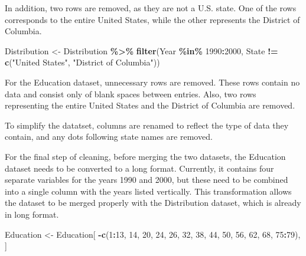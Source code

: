 \documentclass[
]{article}
\newenvironment{Shaded}{\begin{snugshade}}{\end{snugshade}}
\newcommand{\DecValTok}[1]{\textcolor[rgb]{0.00,0.00,0.81}{#1}}
\newcommand{\FunctionTok}[1]{\textcolor[rgb]{0.13,0.29,0.53}{\textbf{#1}}}
\newcommand{\NormalTok}[1]{#1}
\newcommand{\OtherTok}[1]{\textcolor[rgb]{0.56,0.35,0.01}{#1}}
\newcommand{\SpecialCharTok}[1]{\textcolor[rgb]{0.81,0.36,0.00}{\textbf{#1}}}
\newcommand{\StringTok}[1]{\textcolor[rgb]{0.31,0.60,0.02}{#1}}
\begin{document}
In addition, two rows are removed, as they are not a U.S. state. One of
the rows corresponds to the entire United States, while the other
represents the District of Columbia.

\begin{Shaded}
\begin{Highlighting}[]
\NormalTok{Distribution }\OtherTok{\textless{}{-}}\NormalTok{ Distribution }\SpecialCharTok{\%\textgreater{}\%}
  \FunctionTok{filter}\NormalTok{(Year }\SpecialCharTok{\%in\%} \DecValTok{1990}\SpecialCharTok{:}\DecValTok{2000}\NormalTok{, }
\NormalTok{         State }\SpecialCharTok{!=} \FunctionTok{c}\NormalTok{(}\StringTok{"United States"}\NormalTok{, }\StringTok{"District of Columbia"}\NormalTok{))}
\end{Highlighting}
\end{Shaded}

For the Education dataset, unnecessary rows are removed. These rows
contain no data and consist only of blank spaces between entries. Also,
two rows representing the entire United States and the District of
Columbia are removed.

To simplify the datatset, columns are renamed to reflect the type of
data they contain, and any dots following state names are removed.

For the final step of cleaning, before merging the two datasets, the
Education dataset needs to be converted to a long format. Currently, it
contains four separate variables for the years 1990 and 2000, but these
need to be combined into a single column with the years listed
vertically. This transformation allows the dataset to be merged properly
with the Distribution dataset, which is already in long format.

\begin{Shaded}
\begin{Highlighting}[]
\NormalTok{Education }\OtherTok{\textless{}{-}}\NormalTok{ Education[ }\SpecialCharTok{{-}}\FunctionTok{c}\NormalTok{(}\DecValTok{1}\SpecialCharTok{:}\DecValTok{13}\NormalTok{, }\DecValTok{14}\NormalTok{, }\DecValTok{20}\NormalTok{, }\DecValTok{24}\NormalTok{, }\DecValTok{26}\NormalTok{, }\DecValTok{32}\NormalTok{, }\DecValTok{38}\NormalTok{, }\DecValTok{44}\NormalTok{, }\DecValTok{50}\NormalTok{, }\DecValTok{56}\NormalTok{, }\DecValTok{62}\NormalTok{, }\DecValTok{68}\NormalTok{, }\DecValTok{75}\SpecialCharTok{:}\DecValTok{79}\NormalTok{), ]}
\end{Highlighting}
\end{Shaded}
\end{document}

